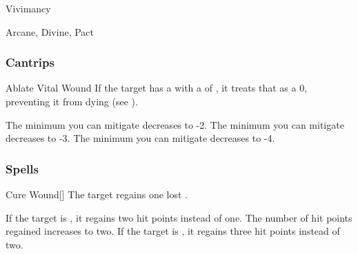 \newpage
\begin{spellsection}{Vivimancy}

\begin{spellheader}
\end{spellheader}


 Arcane, Divine, Pact

\subsubsection{Cantrips}


\begin{freeability}{Ablate Vital Wound}
If the target has a  with a  of , it treats that  as a 0, preventing it from dying (see ).

\rankline
{} The minimum  you can mitigate decreases to -2.
 The minimum  you can mitigate decreases to -3.
 The minimum  you can mitigate decreases to -4.
\end{freeability}

\end{spellsection}


\subsubsection{Spells}


\lowercase{\hypertarget{spell:Cure Wound}{}}\label{spell:Cure Wound}
\begin{freeability}[Rank 1]{\hypertarget{spell:Cure Wound}{Cure Wound}}[]
The target regains one lost .

\rankline
{} If the target is , it regains two hit points instead of one.
 The number of hit points regained increases to two.
 If the target is , it regains three hit points instead of two.
\end{freeability}
\vspace{0.25em}



